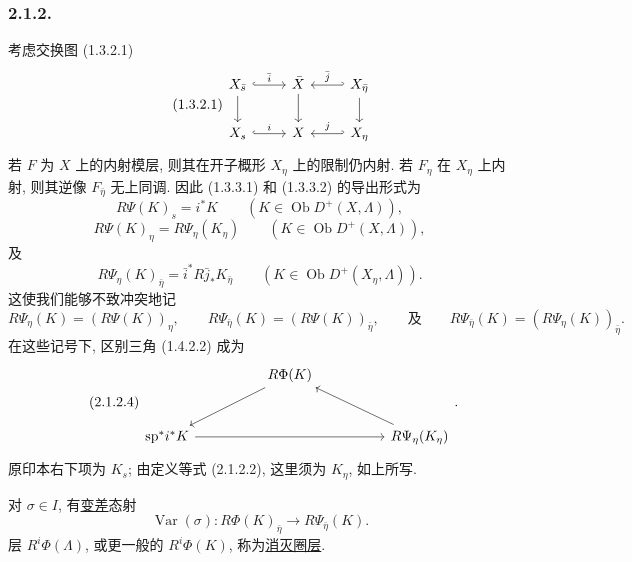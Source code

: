 \subsubsection*{2.1.2.}
考虑交换图 (1.3.2.1)
\begin{equation}\tag{1.3.2.1}
\begin{tikzcd}
X_{\bar s} \arrow[r, hook, "\bar i"] \arrow[d]
  & \bar X \arrow[d]
  & X_{\bar\eta} \arrow[l, hook', "\bar j"'] \arrow[d] \\
X_s \arrow[r, hook, "i"] & X & X_\eta \arrow[l, hook', "j"']
\end{tikzcd}
\end{equation}
若 $F$ 为 $X$ 上的内射模层, 则其在开子概形 $X_\eta$ 上的限制仍内射. 若 $F_\eta$ 在 $X_\eta$ 上内射, 则其逆像 $F_{\bar\eta}$ 无上同调. 因此 (1.3.3.1) 和 (1.3.3.2) 的导出形式为
\begin{equation}\tag{2.1.2.1}
R\Psi(K)_s=i^*K
\qquad(K\in\operatorname{Ob}D^+(X,\Lambda)),
\end{equation}
\begin{equation}\tag{2.1.2.2}
R\Psi(K)_\eta=R\Psi_\eta(K_\eta)
\qquad(K\in\operatorname{Ob}D^+(X,\Lambda)),
\end{equation}
及
\begin{equation}\tag{2.1.2.3}
R\Psi_\eta(K)_{\bar\eta}
=\bar i^*R\bar j_*K_{\bar\eta}
\qquad(K\in\operatorname{Ob}D^+(X_\eta,\Lambda)).
\end{equation}
这使我们能够不致冲突地记
\begin{equation*}
R\Psi_\eta(K)=(R\Psi(K))_\eta,
\qquad
R\Psi_{\bar\eta}(K)=(R\Psi(K))_{\bar\eta},
\qquad\text{及}\qquad
R\Psi_{\bar\eta}(K)=(R\Psi_\eta(K))_{\bar\eta}.
\end{equation*}
在这些记号下, 区别三角 (1.4.2.2) 成为
\begin{equation}\tag{2.1.2.4}
\begin{tikzcd}[row sep=large, column sep=huge]
{} & R\Phi(K) \arrow[dl] & {} \\
\mathrm{sp}^*i^*K \arrow[rr] & {}
  & R\Psi_\eta(K_\eta) \arrow[ul]
\end{tikzcd}
.\end{equation}
原印本右下项为 $K_s$; 由定义等式 (2.1.2.2), 这里须为 $K_\eta$, 如上所写.

对 $\sigma\in I$, 有\underline{变差}态射
\begin{equation}\tag{2.1.2.5}
\operatorname{Var}(\sigma):R\Phi(K)_{\bar\eta}
\longrightarrow R\Psi_{\bar\eta}(K).
\end{equation}
层 $R^i\Phi(\Lambda)$, 或更一般的 $R^i\Phi(K)$, 称为\underline{消灭圈层}.

